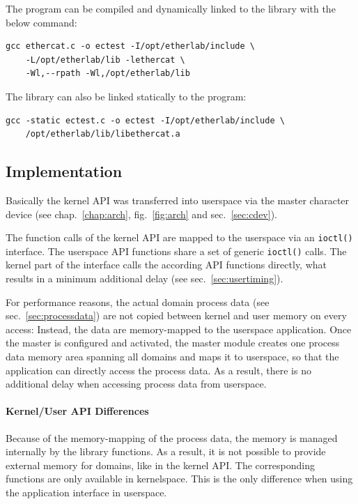 \documentclass[a4paper,12pt,BCOR6mm,bibtotoc,idxtotoc]{scrbook}
\begin{document}
The program can be compiled and dynamically linked to the library with the
below command:

\begin{lstlisting}
gcc ethercat.c -o ectest -I/opt/etherlab/include \
    -L/opt/etherlab/lib -lethercat \
    -Wl,--rpath -Wl,/opt/etherlab/lib
\end{lstlisting}

The library can also be linked statically to the program:

\begin{lstlisting}
gcc -static ectest.c -o ectest -I/opt/etherlab/include \
    /opt/etherlab/lib/libethercat.a
\end{lstlisting}

\subsection{Implementation}
\label{sec:userimp}

Basically the kernel API was transferred into userspace via the master
character device (see chap.~\ref{chap:arch}, fig.~\ref{fig:arch} and
sec.~\ref{sec:cdev}).

The function calls of the kernel API are mapped to the userspace via an
\lstinline+ioctl()+ interface. The userspace API functions share a set of
generic \lstinline+ioctl()+ calls. The kernel part of the interface calls the
according API functions directly, what results in a minimum additional delay
(see sec.~\ref{sec:usertiming}).

For performance reasons, the actual domain process data (see
sec.~\ref{sec:processdata}) are not copied between kernel and user memory on
every access: Instead, the data are memory-mapped to the userspace
application. Once the master is configured and activated, the master module
creates one process data memory area spanning all domains and maps it to
userspace, so that the application can directly access the process data. As a
result, there is no additional delay when accessing process data from
userspace.

\paragraph{Kernel/User API Differences} Because of the memory-mapping of the
process data, the memory is managed internally by the library functions. As a
result, it is not possible to provide external memory for domains, like in the
kernel API. The corresponding functions are only available in kernelspace.
This is the only difference when using the application interface in userspace.
\end{document}
